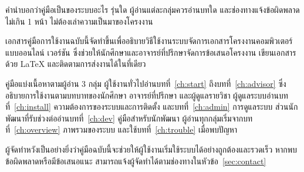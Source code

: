 \begin{guide}
คำนำบอกว่าคู่มือเป็นของระบบอะไร รุ่นใด ผู้อ่านแต่ละกลุ่มควรอ่านบทใด และช่องทางแจ้งข้อผิดพลาด
ไม่เกิน 1 หน้า ไม่ต้องเล่าความเป็นมาของโครงงาน
\end{guide}
เอกสารคู่มือการใช้งานฉบับนี้จัดทำขึ้นเพื่ออธิบายวิธีใช้งานระบบจัดการเอกสารโครงงานคอมพิวเตอร์แบบออนไลน์
เวอร์ชัน \systemversion{} ซึ่งช่วยให้นักศึกษาและอาจารย์ที่ปรึกษาจัดการข้อเสนอโครงงาน
เขียนเอกสารด้วย \LaTeX{} และติดตามการส่งงานได้ในที่เดียว

คู่มือแบ่งเนื้อหาตามผู้อ่าน 3 กลุ่ม ผู้ใช้งานทั่วไปอ่านบทที่~\ref{ch:start} ถึงบทที่~\ref{ch:advisor}
ซึ่งอธิบายการใช้งานตามบทบาทของนักศึกษา อาจารย์ที่ปรึกษา และผู้ดูแลรายวิชา
ผู้ดูแลระบบอ่านบทที่~\ref{ch:install} ความต้องการของระบบและการติดตั้ง และบทที่~\ref{ch:admin} การดูแลระบบ
ส่วนนักพัฒนาที่รับช่วงต่ออ่านบทที่~\ref{ch:dev} คู่มือสำหรับนักพัฒนา ผู้อ่านทุกกลุ่มเริ่มจากบทที่~\ref{ch:overview}
ภาพรวมของระบบ และใช้บทที่~\ref{ch:trouble} เมื่อพบปัญหา

ผู้จัดทำหวังเป็นอย่างยิ่งว่าคู่มือฉบับนี้จะช่วยให้ผู้ใช้งานเริ่มใช้ระบบได้อย่างถูกต้องและรวดเร็ว
หากพบข้อผิดพลาดหรือมีข้อเสนอแนะ สามารถแจ้งผู้จัดทำได้ตามช่องทางในหัวข้อ~\ref{sec:contact}
